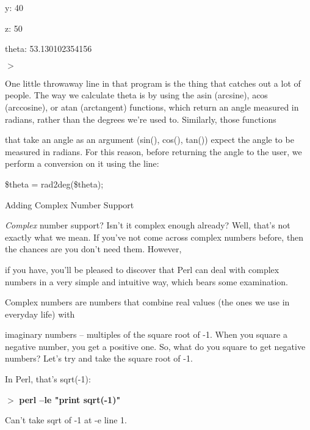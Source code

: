 \documentclass[a4paper,11pt]{book}
\begin{document}
\noindent y: 40

\noindent z: 50

\noindent theta: 53.130102354156

\noindent $>$

\noindent 

\noindent One  little throwaway line in that  program  is  the  thing  that  catches  out a  lot of  people.  The  way  we calculate theta  is by using the  asin (arcsine),  acos (arccosine),  or  atan (arctangent)  functions,  which return an angle  measured  in radians,  rather  than  the  degrees  we're  used  to.  Similarly,  those  functions

\noindent that take an  angle as an argument  (sin(),  cos(),  tan())  expect  the angle  to  be  measured  in radians.  For this reason,  before  returning  the  angle  to  the  user,  we  perform  a  conversion  on  it  using the line:

\noindent 

\noindent 

\noindent \$theta = rad2deg(\$theta);

\noindent 

\noindent 

\noindent Adding Complex Number Support

\noindent 

\noindent \textit{Complex }number support? Isn't it complex enough already? Well, that's not exactly what we mean. If you've not come across complex numbers before, then the chances are you don't need them. However,

\noindent if you have, you'll be pleased to discover that Perl can deal with complex numbers in a very simple and intuitive way, which bears some examination.

\noindent 

\noindent 

\noindent Complex numbers are numbers that combine real values (the ones we use in everyday life) with

\noindent imaginary numbers -- multiples of the square root of -1. When you square a negative number, you get a positive one. So, what do you square to get negative numbers? Let's try and take the square root of -1.

\noindent In Perl, that's sqrt(-1):

\noindent 

\noindent $>$ \textbf{perl --le "print sqrt(-1)"}

\noindent Can't take sqrt of -1 at -e line 1.
\end{document}
